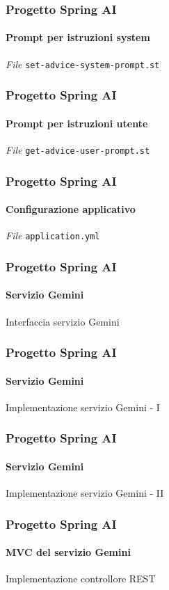 %
\begin{frame}[t,fragile] \frametitle{Progetto Spring AI}
    \framesubtitle{Prompt per istruzioni system}
        \begin{block}{\textit{File} \texttt{set-advice-system-prompt.st}}
			{\tiny}
    	\end{block}
\end{frame}
%
\begin{frame}[t,fragile] \frametitle{Progetto Spring AI}
    \framesubtitle{Prompt per istruzioni utente}
        \begin{block}{\textit{File} \texttt{get-advice-user-prompt.st}}
			{\tiny}
    	\end{block}
\end{frame}
%
\begin{frame}[t,fragile] \frametitle{Progetto Spring AI}
    \framesubtitle{Configurazione applicativo}
        \begin{block}{\textit{File} \texttt{application.yml}}
			{\tiny}
    	\end{block}
\end{frame}
%
\begin{frame}[t,fragile] \frametitle{Progetto Spring AI}
    \framesubtitle{Servizio Gemini}
        \begin{block}{Interfaccia servizio Gemini}
{\tiny}
    \end{block}
\end{frame}
%
\begin{frame}[t,fragile] \frametitle{Progetto Spring AI}
    \framesubtitle{Servizio Gemini}
		\vspace*{-.7cm}
        \begin{block}{Implementazione servizio Gemini - I}
            {\tiny}
    \end{block}
\end{frame}
%
\begin{frame}[t,fragile] \frametitle{Progetto Spring AI}
    \framesubtitle{Servizio Gemini}
        \vspace*{-.7cm}
        \begin{block}{Implementazione servizio Gemini - II}
            {\tiny}
    \end{block}
\end{frame}
%
\begin{frame}[t,fragile] \frametitle{Progetto Spring AI}
    \framesubtitle{MVC del servizio Gemini}
    	\vspace*{-.7cm}
        \begin{block}{Implementazione controllore REST}
			{\tiny}
    	\end{block}
\end{frame}
